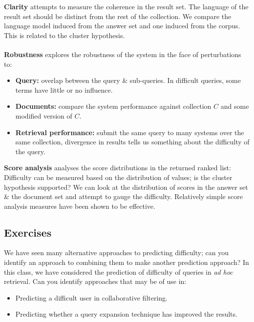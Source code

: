\documentclass[a4paper,11pt]{article}
\begin{document}
\textbf{Clarity} attempts to measure the coherence in the result set.
The language of the result set should be distinct from the rest of the collection.
We compare the language model induced from the answer set and one induced from the corpus.
This is related to the cluster hypothesis.
\\\\
\textbf{Robustness} explores the robustness of the system in the face of perturbations to:
\begin{itemize}
    \item   \textbf{Query:} overlap between the query \& sub-queries.
            In difficult queries, some terms have little or no influence.
    \item   \textbf{Documents:} compare the system performance against collection $C$ and some modified version of $C$.
    \item   \textbf{Retrieval performance:} submit the same query to many systems over the same collection,
            divergence in results tells us something about the difficulty of the query.
\end{itemize}

\textbf{Score analysis} analyses the score distributions in the returned ranked list:
Difficulty can be measured based on the distribution of values; is the cluster hypothesis supported?
We can look at the distribution of scores in the answer set \& the document set and attempt to gauge the difficulty.
Relatively simple score analysis measures have been shown to be effective.

\subsection{Exercises}
We have seen many alternative approaches to predicting difficulty; can you identify an approach to combining them to make another prediction approach?
In this class, we have considered the prediction of difficulty of queries in \textit{ad hoc} retrieval.
Can you identify approaches that may be of use in:
\begin{itemize}
    \item   Predicting a difficult user in collaborative filtering.
    \item   Predicting whether a query expansion technique has improved the results.
\end{itemize}
\end{document}
